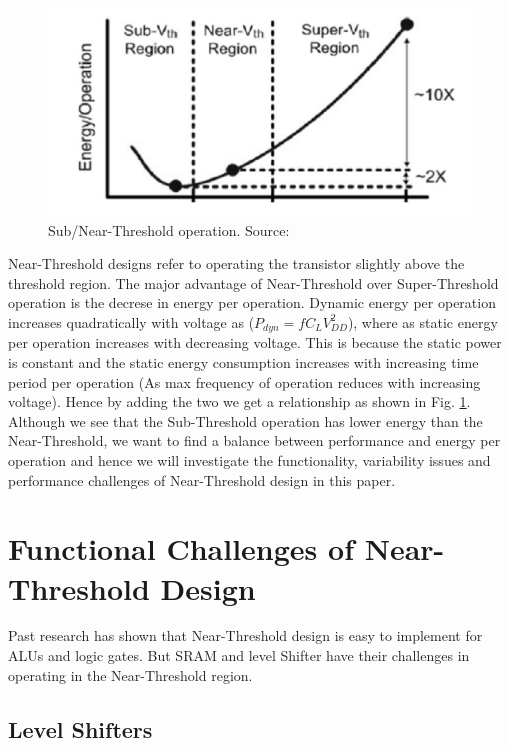 \documentclass[conference]{IEEEtran}
\begin{document}
\begin{figure}[htbp]
	\includegraphics[width=\linewidth]{img/Pictures/Energy_comparison.png}
	\centering
	\caption{Sub/Near-Threshold operation. Source: \cite{b1}}
	\label{fig:Energy_comparison}
\end{figure}

Near-Threshold designs refer to operating the transistor slightly above the
threshold region. The major advantage of Near-Threshold over Super-Threshold operation is the decrese in energy per operation.
Dynamic energy per operation increases quadratically with voltage as ($P_{dyn}=fC_LV_{DD}^2$), where as static energy per operation increases with decreasing voltage. This is because the static power
is constant and the static energy consumption increases with increasing time period per operation (As max frequency of operation reduces with increasing voltage).
Hence by adding the two we get a relationship as shown in Fig. \ref{fig:Energy_comparison}. Although we see that the Sub-Threshold operation
has lower energy than the Near-Threshold, we want to find a balance between
performance and energy per operation and hence we will investigate the
functionality, variability issues and performance challenges of Near-Threshold
design in this paper.

\section{Functional Challenges of Near-Threshold Design}
\label{sec:Func_challenges}

Past research has shown that Near-Threshold design is easy to implement for ALUs and logic gates. But SRAM and level Shifter have their challenges in operating in the Near-Threshold region.

\subsection{Level Shifters}
\end{document}
